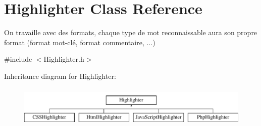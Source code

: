 \hypertarget{class_highlighter}{
\section{Highlighter Class Reference}
\label{class_highlighter}
}


On travaille avec des formats, chaque type de mot reconnaissable aura son propre format (format mot-\/clé, format commentaire, ...)  




{\ttfamily \#include $<$Highlighter.h$>$}

Inheritance diagram for Highlighter:\begin{figure}[H]
\begin{center}
\leavevmode
\includegraphics[height=1.971831cm]{class_highlighter}
\end{center}
\end{figure}

